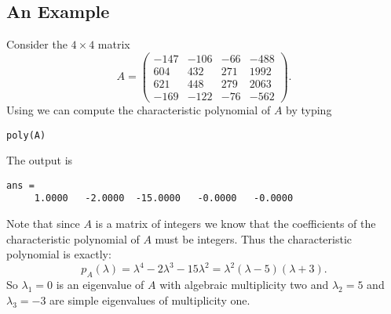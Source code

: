 \subsection*{An Example}

Consider the $4\times 4$ matrix
\begin{equation*} \label{e:Aexamp}
A=\left(\begin{array}{rrrr}      -147  &  -106      &   -66     &   -488\\
         604   &      432      &   271     &   1992\\
         621   &      448       &  279     &   2063\\
        -169    &    -122      &   -76     &   -562\end{array}\right).
\end{equation*}
Using \Matlab we can compute the characteristic polynomial of $A$
by typing
\begin{verbatim}
poly(A)
\end{verbatim}
The output is
\begin{verbatim}
ans =
     1.0000   -2.0000  -15.0000   -0.0000   -0.0000
\end{verbatim}
Note that since $A$ is a matrix of integers we know that the coefficients 
of the characteristic polynomial of $A$ must be integers.   Thus the 
characteristic polynomial is exactly:
\[
p_A(\lambda) = \lambda^4-2\lambda^3-15\lambda^2 =
	\lambda^2(\lambda-5)(\lambda+3).
\]
So $\lambda_1=0$ is an eigenvalue of $A$ with 
algebraic multiplicity two
and $\lambda_2=5$ and $\lambda_3=-3$ are simple eigenvalues of 
multiplicity one.


